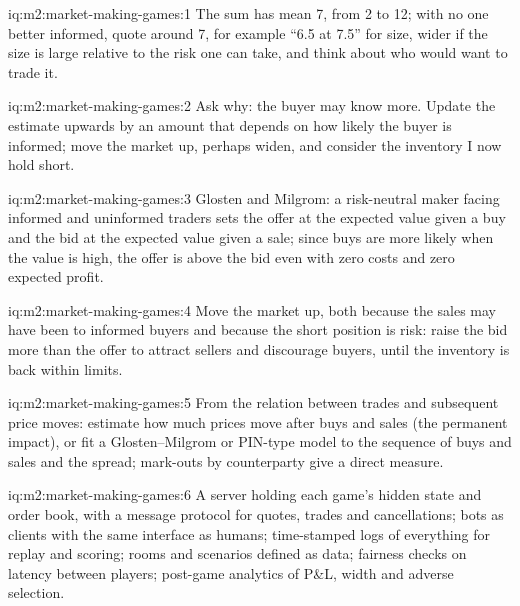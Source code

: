 \begin{solution}{iq:m2:market-making-games:1}
The sum has mean 7, from 2 to 12; with no one better informed, quote around 7, for
example ``6.5 at 7.5'' for size, wider if the size is large relative to the risk one can
take, and think about who would want to trade it.
\end{solution}

\begin{solution}{iq:m2:market-making-games:2}
Ask why: the buyer may know more. Update the estimate upwards by an amount that depends
on how likely the buyer is informed; move the market up, perhaps widen, and consider the
inventory I now hold short.
\end{solution}

\begin{solution}{iq:m2:market-making-games:3}
Glosten and Milgrom: a risk-neutral maker facing informed and uninformed traders sets the
offer at the expected value given a buy and the bid at the expected value given a sale;
since buys are more likely when the value is high, the offer is above the bid even with
zero costs and zero expected profit.
\end{solution}

\begin{solution}{iq:m2:market-making-games:4}
Move the market up, both because the sales may have been to informed buyers and because
the short position is risk: raise the bid more than the offer to attract sellers and
discourage buyers, until the inventory is back within limits.
\end{solution}

\begin{solution}{iq:m2:market-making-games:5}
From the relation between trades and subsequent price moves: estimate how much prices
move after buys and sales (the permanent impact), or fit a Glosten--Milgrom or PIN-type
model to the sequence of buys and sales and the spread; mark-outs by counterparty give a
direct measure.
\end{solution}

\begin{solution}{iq:m2:market-making-games:6}
A server holding each game's hidden state and order book, with a message protocol for
quotes, trades and cancellations; bots as clients with the same interface as humans;
time-stamped logs of everything for replay and scoring; rooms and scenarios defined as
data; fairness checks on latency between players; post-game analytics of P\&L, width and
adverse selection.
\end{solution}
